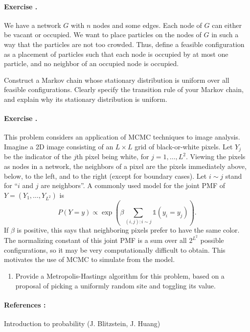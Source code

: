 \documentclass[twocolumn,12pt,a4paper]{article}
\newcounter{num}  %
\begin{document}
\paragraph{Exercise \thenum.}
We have a network $G$ with $n$ nodes and some edges. Each node of $G$ can either be vacant or occupied. We want to place particles on the nodes of $G$ in such a way that the particles are not too crowded. Thus, define a feasible configuration as a placement of particles such that each node is occupied by at most one particle, and no neighbor of an occupied node is occupied.

Construct a Markov chain whose stationary distribution is uniform over all feasible configurations. Clearly specify the transition rule of your Markov chain, and explain why its stationary distribution is uniform.


\paragraph{Exercise \thenum.}
This problem considers an application of MCMC techniques to image analysis. Imagine a 2D image consisting of an $L \times L$ grid of black-or-white pixels. Let $Y_j$ be the indicator of the $j$th pixel being white, for $j = 1, \ldots, L^2$. Viewing the pixels as nodes in a network, the neighbors of a pixel are the pixels immediately above, below, to the left, and to the right (except for boundary cases).
Let $i \sim j$ stand for ``$i$ and $j$ are neighbors''. A commonly used model for the joint PMF of $Y = (Y_1, \ldots, Y_{L^2})$ is
\[
P(Y = y) \propto \exp\left( \beta \sum_{(i,j): i \sim j} \mathds{1}(y_i = y_j) \right).
\]
If $\beta$ is positive, this says that neighboring pixels prefer to have the same color. The normalizing constant of this joint PMF is a sum over all $2^{L^2}$ possible configurations, so it may be very computationally difficult to obtain. This motivates the use of MCMC to simulate from the model.

\begin{enumerate}
	\item 
	Provide a Metropolis-Hastings algorithm for this problem, based on a proposal of picking a uniformly random site and toggling its value.
\end{enumerate}


\paragraph{References :} Introduction to probability (J. Blitzstein, J. Huang)
\end{document}
